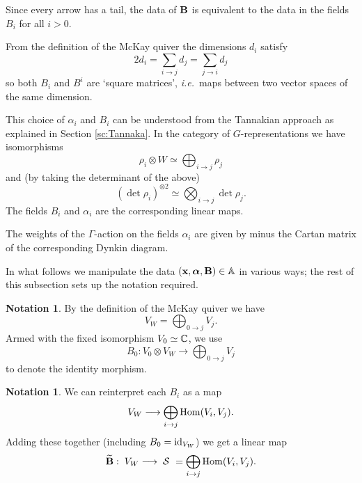 \documentclass{amsart}
\newcommand{\balpha}{\boldsymbol{\alpha}}
\theoremstyle{definition}
\newtheorem{notn}[theorem]{Notation}
\newcommand\VW{V_W}
\begin{document}
\begin{remark}
Since every arrow has a tail, the data of $\mathbf{B}$ is equivalent to the data in the fields $B_i$ for all $i>0$.
\end{remark}

From the definition of the McKay quiver the dimensions $d_i$ satisfy
\begin{equation*}\label{eq:drelation} 2d_i = \sum_{i\rightarrow j} d_j = \sum_{j\rightarrow i} d_j \end{equation*}
so both $B_i$ and $B^i$ are `square matrices', \emph{i.e.}~maps between two vector spaces of the same dimension.
\begin{remark}\label{rm:Tannaka}
This choice of $\alpha_i$ and $B_i$ can be understood from the Tannakian approach as explained in Section \ref{sc:Tannaka}.  In the category of $G$-representations we have isomorphisms
$$\rho_i\otimes W \simeq \bigoplus_{i\to j} \rho_j$$
and (by taking the determinant of the above)
$$ (\det \rho_i)^{\otimes 2} \simeq \bigotimes_{i\to j} \det \rho_j. $$
The fields $B_i$ and $\alpha_i$ are the corresponding linear maps.
\end{remark}

\begin{remark}\label{rm:cartan}
The weights of the $\Gamma$-action on the fields $\alpha_i$ are given by minus the Cartan matrix of the corresponding Dynkin diagram.
\end{remark}

In what follows we manipulate the data $(\bfx, \balpha, \bfB) \in \bA$ in various ways; the rest of this subsection sets up the notation required.

\begin{notn}
By the definition of the McKay quiver we have
\begin{equation}\label{eq:from0} \VW = \bigoplus_{0\to j} V_j. \end{equation}
Armed with the fixed isomorphism $V_0 \simeq \mathbb{C}$, we use $$B_0 \colon V_0\otimes V_W \longrightarrow\bigoplus_{0\to j} V_j$$ to denote the identity morphism. 
\end{notn}

\begin{notn}
We can reinterpret each $B_i$ as a map
$$ \VW \longrightarrow \bigoplus_{i\to j} \Hom( V_i,  V_j). $$
Adding these together (including $B_0=\id_{\VW}$) we get a linear map
$$\widetilde{\bfB} :\; \VW \longrightarrow\; \cS \,\,=\bigoplus_{i\to j} \Hom(V_i, V_j).$$
\end{notn}
\end{document}
